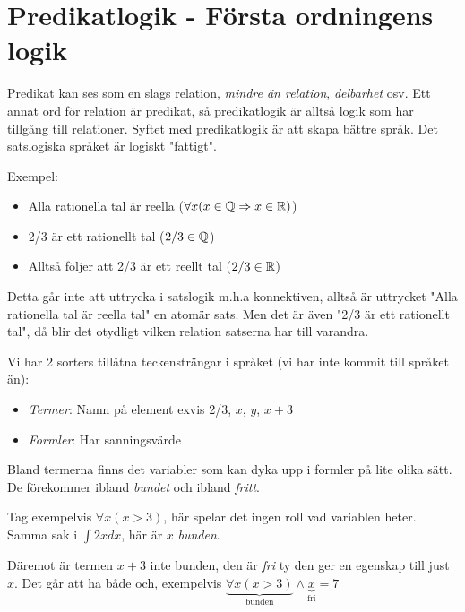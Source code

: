 \section{Predikatlogik - Första ordningens logik}
\par\bigskip
\noindent Predikat kan ses som en slags relation, \textit{mindre än relation}, \textit{delbarhet} osv. Ett annat ord för relation är predikat, så predikatlogik är alltså logik som har tillgång till relationer. Syftet med predikatlogik är att skapa bättre språk. Det satslogiska språket är logiskt "fattigt".
\par\bigskip
\noindent Exempel:\par
\begin{itemize}
  \item Alla rationella tal är reella ($\forall x(x\in\mathbb{Q}\Rightarrow x\in\mathbb{R})$)
  \item 2/3 är ett rationellt tal ($2/3\in\mathbb{Q}$)
  \item Alltså följer att 2/3 är ett reellt tal ($2/3\in\mathbb{R}$)
\end{itemize}
\par\bigskip
\noindent Detta går inte att uttrycka i satslogik m.h.a konnektiven, alltså är uttrycket "Alla rationella tal är reella tal" en atomär sats. Men det är även "2/3 är ett rationellt tal", då blir det otydligt vilken relation satserna har till varandra.
\par\bigskip
\noindent Vi har 2 sorters tillåtna teckensträngar i språket (vi har inte kommit till språket än):
\begin{itemize}
  \item \textit{Termer}: Namn på element exvis 2/3, $x$, $y$, $x+3$
  \item \textit{Formler}: Har sanningsvärde 
\end{itemize}
\par\bigskip
\noindent Bland termerna finns det variabler som kan dyka upp i formler på lite olika sätt. De förekommer ibland \textit{bundet} och ibland \textit{fritt}.\par
\noindent Tag exempelvis $\forall x(x>3)$, här spelar det ingen roll vad variablen heter. Samma sak i $\int 2xdx$, här är $x$ \textit{bunden}.\par
\noindent Däremot är termen $x+3$ inte bunden, den är \textit{fri} ty den ger en egenskap till just $x$. Det går att ha både och, exempelvis $\underbrace{\forall x (x>3)}_{\text{bunden}}\wedge \underbrace{x}_{\text{fri}} = 7$
\par\bigskip
